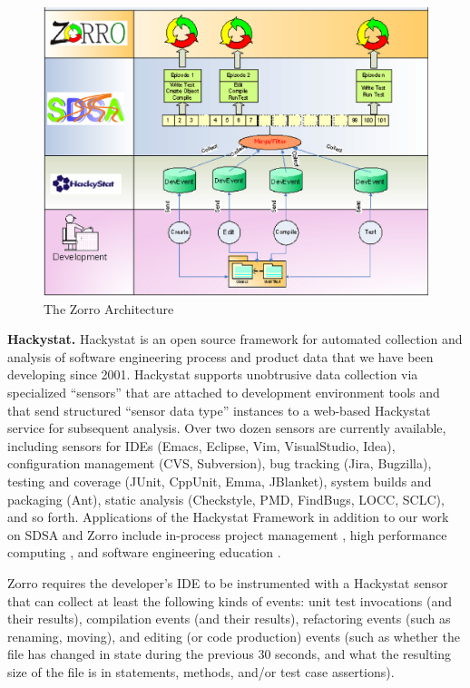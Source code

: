 \documentclass[smallextended]{svjour3}     %
\begin{document}
\begin{figure}[th]
  \center
  \includegraphics[width=1.0\textwidth]{zorro-architecture.eps}
  \caption{The Zorro Architecture}
  \label{fig:ZorroArchitecture}
\end{figure} 


{\bf Hackystat.} Hackystat  \citep{csdl2-04-11,csdl2-04-22,csdl2-03-12} is an open source framework for automated
collection and analysis of software engineering process and product data
that we have been developing since 2001. Hackystat supports unobtrusive
data collection via specialized ``sensors'' that are attached to
development environment tools and that send structured ``sensor data type''
instances to a web-based Hackystat service for subsequent analysis.  Over
two dozen sensors are currently available, including sensors for IDEs
(Emacs, Eclipse, Vim, VisualStudio, Idea), configuration management (CVS,
Subversion), bug tracking (Jira, Bugzilla), testing and coverage (JUnit,
CppUnit, Emma, JBlanket), system builds and packaging (Ant), static
analysis (Checkstyle, PMD, FindBugs, LOCC, SCLC), and so forth.
Applications of the Hackystat Framework in addition to our work on SDSA and
Zorro include in-process project management \citep{csdl2-04-11}, high
performance computing \citep{csdl2-04-22}, and software engineering
education \citep{csdl2-03-12}.

Zorro requires the developer's IDE to be instrumented with a Hackystat
sensor that can collect at least the following kinds of events: unit test
invocations (and their results), compilation events (and their results),
refactoring events (such as renaming, moving), and editing (or code
production) events (such as whether the file has changed in state during
the previous 30 seconds, and what the resulting size of the file is in
statements, methods, and/or test case assertions).
\end{document}
